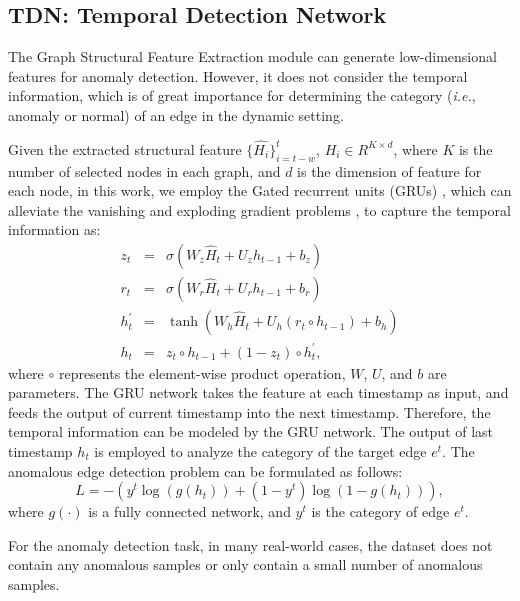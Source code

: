 \documentclass{article}
\begin{document}
\subsection{\textbf{TDN}: Temporal Detection Network}
\label{subsec:tdn}
The Graph Structural Feature Extraction module can generate low-dimensional features for anomaly detection. However, it does not consider the temporal information, which is of great importance for determining the category (\textit{i.e.}, anomaly or normal) of an edge in the dynamic setting. 


Given the extracted structural feature $\{\hat{H_i}\}_{i=t-w}^t$,  $H_i \in R^{K \times d}$, where $K$ is the number of selected nodes in each graph, and $d$ is the dimension of feature for each node, in this work, we employ the Gated recurrent units (GRUs) \cite{chung2014empirical}, which can alleviate the vanishing and exploding gradient problems \cite{goodfellow2016deep}, to capture the temporal information as:
\begin{eqnarray}
z_t &=& \sigma(W_z\hat{H}_t+U_zh_{t-1}+b_z)\\
r_t &=& \sigma(W_r\hat{H}_t+U_rh_{t-1}+b_r)\\
h_t^{'} &=& \tanh(W_h\hat{H}_t+U_h(r_t\circ h_{t-1})+b_h)\\
h_t &=& z_t\circ h_{t-1} + (1-z_t)\circ h_t^{'},
\end{eqnarray}
where $\circ$ represents the element-wise product operation, $W$, $U$, and $b$ are parameters. The GRU network takes the feature at each timestamp as input, and feeds the output of current timestamp into the next timestamp. Therefore, the temporal information can be modeled by the GRU network. The output of last timestamp $h_t$ is employed to analyze the category of the target edge $e^t$. The anomalous edge detection problem can be formulated as follows:
\begin{equation} \label{eq:loss}
L = -(y^t\log(g(h_t)) + (1-y^t)\log(1-g(h_t))),
\end{equation}
where $g(\cdot)$ is a fully connected network, and $y^t$ is the category of edge $e^t$.

For the anomaly detection task, in many real-world cases, the dataset does not contain any anomalous samples or only contain a small number of anomalous samples. 
\end{document}
